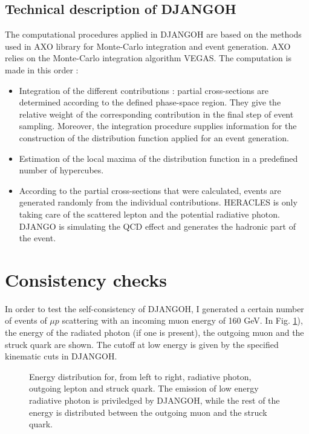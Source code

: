 \subsection{Technical description of DJANGOH}

The computational procedures applied in DJANGOH are based on the methods used in AXO\cite{AXO}
library for Monte-Carlo integration and event generation. AXO relies on the Monte-Carlo
integration algorithm VEGAS\cite{VEGAS}. The computation is made in this order :

\begin{itemize}
\item Integration of the different contributions : partial cross-sections are determined
according to the defined phase-space region. They give the relative weight of the
corresponding contribution in the final step of event sampling. Moreover, the integration
procedure supplies information for the construction of the distribution function
applied for an event generation.
\item Estimation of the local maxima of the distribution function in a predefined number
of hypercubes.
\item According to the partial cross-sections that were calculated, events are generated
randomly from the individual contributions. HERACLES is only taking care of the scattered
lepton and the potential radiative photon. DJANGO is simulating the QCD effect and generates
the hadronic part of the event.
\end{itemize}



\section{Consistency checks}

In order to test the self-consistency of DJANGOH, I generated a certain number of
events of $\mu p$ scattering with an incoming muon energy of 160 GeV. In Fig. \ref{fig:edist}),
the energy of the radiated photon (if one is present), the outgoing muon and the struck quark
are shown. The cutoff at low energy is given by the specified kinematic cuts in DJANGOH.

\begin{figure}[htb]
\centerline{}
\caption{Energy distribution for, from left to right, radiative photon, outgoing lepton and struck quark.
The emission of low energy radiative photon is priviledged by DJANGOH, while the rest of the energy is distributed
between the outgoing muon and the struck quark.}\label{fig:edist}
\end{figure}

